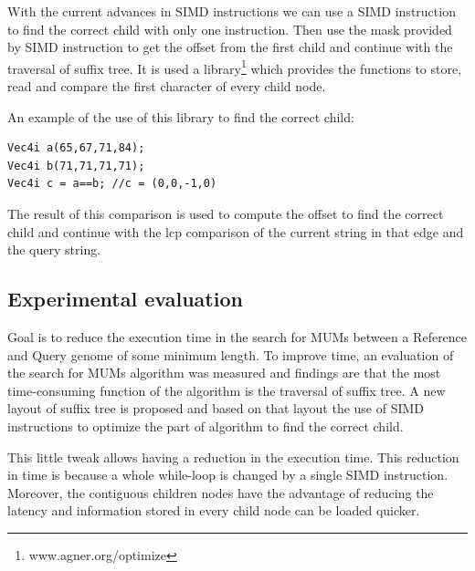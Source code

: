 \documentclass[conference]{IEEEtran}
\begin{document}
With the current advances in SIMD instructions we can use a SIMD instruction to find the correct child with only one instruction. Then use the mask provided by SIMD instruction to get the offset from the first child and continue with the traversal of suffix tree. It is used a library\footnote{www.agner.org/optimize} which provides the functions to store, read and compare the first character of every child node.

An example of the use of this library to find the correct child:
\begin{verbatim}
Vec4i a(65,67,71,84);
Vec4i b(71,71,71,71);
Vec4i c = a==b; //c = (0,0,-1,0)
\end{verbatim}
 
The result of this comparison is used to compute the offset to find the correct child and continue with the lcp comparison of the current string in that edge and the query string.

\subsection{Experimental evaluation}
\label{experimental}
Goal is to reduce the execution time in the search for MUMs between a Reference and Query genome of some minimum length. To improve time, an evaluation of the search for MUMs algorithm was measured and findings are that the most time-consuming function of the algorithm is the traversal of suffix tree. A new layout of suffix tree is proposed and based on that layout the use of SIMD instructions to optimize the part of algorithm to find the correct child.

This little tweak allows having a reduction in the execution time. This reduction in time is because a whole while-loop is changed by a single SIMD instruction. Moreover, the contiguous children nodes have the advantage of reducing the latency and information stored in every child node can be loaded quicker.
\end{document}
